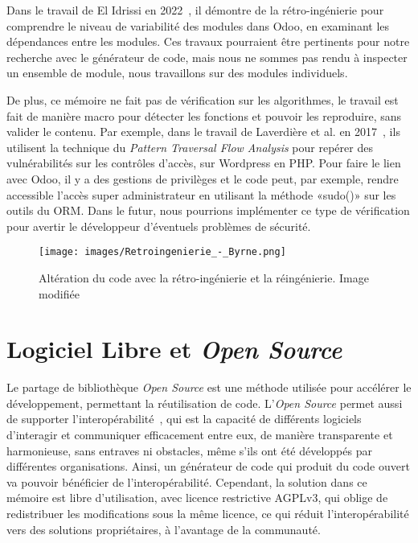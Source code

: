 Dans le travail de El Idrissi en 2022~\cite{elthesis_2022}, il démontre de la rétro-ingénierie pour comprendre le niveau de variabilité des modules dans Odoo, en examinant les dépendances entre les modules. Ces travaux pourraient être pertinents pour notre recherche avec le générateur de code, mais nous ne sommes pas rendu à inspecter un ensemble de module, nous travaillons sur des modules individuels.

De plus, ce mémoire ne fait pas de vérification sur les algorithmes, le travail est fait de manière macro pour détecter les fonctions et pouvoir les reproduire, sans valider le contenu. Par exemple, dans le travail de Laverdière et al. en 2017~\cite{retro_privilege_protection_2017}, ils utilisent la technique du \textit{Pattern Traversal Flow Analysis} pour repérer des vulnérabilités sur les contrôles d'accès, sur Wordpress en PHP. Pour faire le lien avec Odoo, il y a des gestions de privilèges et le code peut, par exemple, rendre accessible l'accès super administrateur en utilisant la méthode «sudo()» sur les outils du ORM. Dans le futur, nous pourrions implémenter ce type de vérification pour avertir le développeur d'éventuels problèmes de sécurité.

\begin{figure}[htb]
\centering
\texttt{[image: images/Retroingenierie\_-\_Byrne.png]}
\caption{Altération du code avec la rétro-ingénierie et la réingénierie. Image modifiée~\cite{wikipedia_image_retroingenierie}}
\label{fig:retro_re_ing}
\end{figure}

\section{Logiciel Libre et \textit{Open Source}}

Le partage de bibliothèque \textit{Open Source} est une méthode utilisée pour accélérer le développement, permettant la réutilisation de code. L’\textit{Open Source} permet aussi de supporter l'interopérabilité~\cite{open_interop_2011}, qui est la capacité de différents logiciels d'interagir et communiquer efficacement entre eux, de manière transparente et harmonieuse, sans entraves ni obstacles, même s’ils ont été développés par différentes organisations. Ainsi, un générateur de code qui produit du code ouvert va pouvoir bénéficier de l'interopérabilité. Cependant, la solution dans ce mémoire est libre d'utilisation, avec licence restrictive AGPLv3, qui oblige de redistribuer les modifications sous la même licence, ce qui réduit l'interopérabilité vers des solutions propriétaires, à l'avantage de la communauté.

